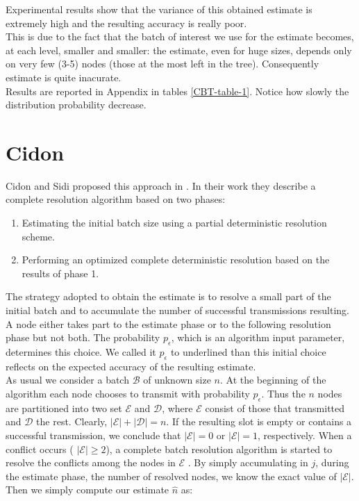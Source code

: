 \documentclass[11pt,a4paper,twoside,openright]{book}
\newcommand{\pc}{p_{\epsilon}}
\begin{document}
Experimental results show that the variance of this obtained estimate is extremely high and the resulting accuracy is really poor.\\ 
This is due to the fact that the batch of interest we use for the estimate becomes, at each level, smaller and smaller: the estimate, even for huge sizes, depends only on very few (3-5) nodes (those at the most left in the tree). Consequently estimate is quite inacurate.\\
Results are reported in Appendix in tables  \ref{CBT-table-1}. Notice how slowly the distribution probability decrease.
\section{Cidon}
\label{se:cidon}
Cidon and Sidi proposed this approach in \cite{cidon}. In their work they describe a complete resolution algorithm based on two phases:
 
\begin{enumerate}
\item Estimating the initial batch size using a partial deterministic resolution scheme. 
\item Performing an optimized complete deterministic resolution based on the results of phase 1. 
\end{enumerate}

The strategy adopted to obtain the estimate is to resolve a small part of the initial batch and to accumulate the number of successful transmissions resulting.\\

A node either takes part to the estimate phase or to the following resolution phase but not both.
The probability $\pc$, which is an algorithm input parameter, determines this choice.
We called it $\pc$ to underlined than this initial choice reflects on the expected accuracy of the resulting estimate.\\

As usual we consider a batch $\mathcal{B}$ of unknown size $n$.
At the beginning of the algorithm each node chooses to transmit with probability $\pc$. Thus the $n$ nodes are partitioned into two set $\mathcal{E}$ and $\mathcal{D}$, where $\mathcal{E}$ consist of those that transmitted and $\mathcal{D}$ the rest. Clearly, $|\mathcal{E}|+|\mathcal{D}|=n$. If the resulting slot is empty or contains a successful transmission, we conclude that $|\mathcal{E}|=0$  or $|\mathcal{E}|=1$, respectively. When a conflict occurs ( $|\mathcal{E}|\geq2$), a complete batch resolution algorithm is started to resolve the conflicts among  the nodes in $\mathcal{E}$ . By simply accumulating in $j$, during the estimate phase, the number of resolved nodes, we know the exact value of $|\mathcal{E}|$.
Then we simply compute our estimate $\hat{n}$ as: 
\end{document}
